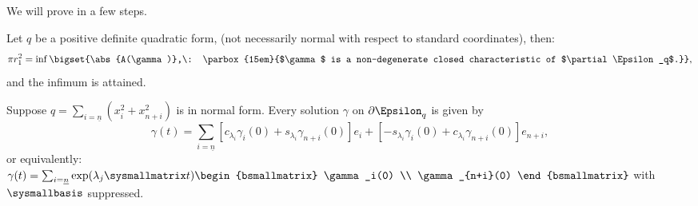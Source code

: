 \documentclass[../main-v2-manifolds.tex]{subfiles}
\begin{document}
We will prove  in a few steps.
\begin{wts}\label{thm:symplectic action on the boundary of ellipsoids}
    Let $q$ be a positive definite quadratic form, (not necessarily normal with respect to standard coordinates), then:
    \[
        \pi r_1^2 = \inf\bigset{\abs{A(\gamma)},\: \parbox{15em}{$\gamma$ is a non-degenerate closed characteristic of $\partial \Epsilon_q$.}},
    \]
    and the infimum is attained.
\end{wts}
\begin{step}
    Suppose $q = \sum_{i=\underline{n}}(x^2_{i} + x^2_{n+i})$ is in normal form. Every solution $\gamma$ on $\partial \Epsilon_q$ is given by
    \[
        \gamma(t) = \sum_{i=\underline{n}} [c_{\lambda_i}\gamma_i(0) + s_{\lambda_i}\gamma_{n+i}(0)]e_i + [-s_{\lambda_i}\gamma_i(0) + c_{\lambda_i}\gamma_{n+i}(0)]e_{n+i},
    \]
    or equivalently: $\gamma(t) = \sum_{i=\underline{n}}\exp(\lambda_j\sysmallmatrix t)\begin{bsmallmatrix}
            \gamma_i(0) \\ \gamma_{n+i}(0)
        \end{bsmallmatrix}$ with $\sysmallbasis$ suppressed.
\end{step}
\end{document}
